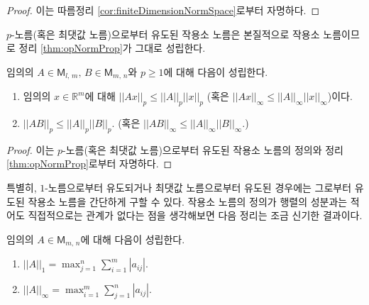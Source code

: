 \begin{proof}
    이는 따름정리 \ref{cor:finiteDimensionNormSpace}로부터 자명하다.
\end{proof}

$p$-노름(혹은 최댓값 노름)으로부터 유도된 작용소 노름은 본질적으로 작용소 노름이므로 정리 \ref{thm:opNormProp}가 그대로 성립한다.

\begin{theorem}
    임의의 $A\in\mathsf{M}_{l,\,m},\,B\in\mathsf{M}_{m,\,n}$와 $p\geq1$에 대해 다음이 성립한다.
    \begin{enumerate}
        \item 임의의 $x\in\mathbb{R}^m$에 대해 $||Ax||_p\leq||A||_p||x||_p$ (혹은 $||Ax||_\infty\leq||A||_\infty||x||_\infty$)이다.
        \item $||AB||_p\leq||A||_p||B||_p$. (혹은 $||AB||_\infty\leq||A||_\infty||B||_\infty$.)
    \end{enumerate}
\end{theorem}

\begin{proof}
    이는 $p$-노름(혹은 최댓값 노름)으로부터 유도된 작용소 노름의 정의와 정리 \ref{thm:opNormProp}로부터 자명하다.
\end{proof}

특별히, $1$-노름으로부터 유도되거나 최댓값 노름으로부터 유도된 경우에는 그로부터 유도된 작용소 노름을 간단하게 구할 수 있다. 작용소 노름의 정의가 행렬의 성분과는 적어도 직접적으로는 관계가 없다는 점을 생각해보면 다음 정리는 조금 신기한 결과이다.

\begin{theorem}
    임의의 $A\in\mathsf{M}_{m,\,n}$에 대해 다음이 성립한다.
    \begin{enumerate}
        \item $||A||_1=\max_{j=1}^n\sum_{i=1}^m|a_{ij}|$.
        \item $||A||_\infty=\max_{i=1}^m\sum_{j=1}^n|a_{ij}|$.
    \end{enumerate}
\end{theorem}

